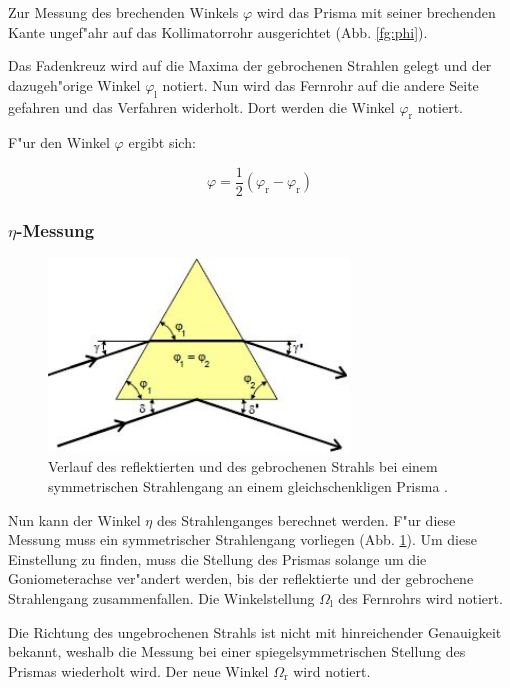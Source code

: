	Zur Messung des brechenden Winkels $\varphi$ wird das Prisma mit seiner brechenden Kante ungef"ahr auf das Kollimatorrohr ausgerichtet (Abb. \ref{fg:phi}).

	Das Fadenkreuz wird auf die Maxima der gebrochenen Strahlen gelegt und der dazugeh"orige Winkel $\varphi_\mathrm{l}$ notiert. Nun wird das Fernrohr auf die andere Seite gefahren und das Verfahren widerholt. Dort werden die Winkel $\varphi_\mathrm{r}$ notiert.

	F"ur den Winkel $\varphi$ ergibt sich:

	\begin{equation}
		\varphi = \frac{1}{2} ( \varphi_\mathrm{r} - \varphi_\mathrm{r} ) \label{eqn:phi}
	\end{equation}

	\subsubsection{$\eta$-Messung} %
	\label{sub:subsection_name}
	
	\begin{figure}[!h]
		\centering
		\includegraphics[width = 8cm]{img/eta.JPG}
		\caption{Verlauf des reflektierten und des gebrochenen Strahls bei einem symmetrischen Strahlengang an einem gleichschenkligen Prisma \cite{anleitung}.}
		\label{fg:eta}
	\end{figure}

	Nun kann der Winkel $\eta$ des Strahlenganges berechnet werden.
	F"ur diese Messung muss ein symmetrischer Strahlengang vorliegen (Abb. \ref{fg:eta}).
	Um diese Einstellung zu finden, muss die Stellung des Prismas solange um die Goniometerachse ver"andert werden, bis der reflektierte und der gebrochene Strahlengang zusammenfallen. Die Winkelstellung $\Omega_\mathrm{l}$ des Fernrohrs wird notiert.

	Die Richtung des ungebrochenen Strahls ist nicht mit hinreichender Genauigkeit bekannt, weshalb die Messung bei einer spiegelsymmetrischen Stellung des Prismas wiederholt wird. Der neue Winkel $\Omega_\mathrm{r}$ wird notiert.

